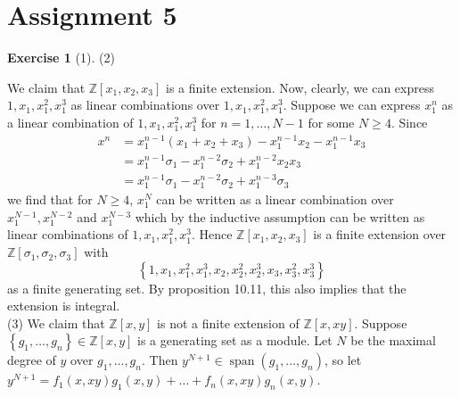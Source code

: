 \documentclass[reqno]{amsart}
\theoremstyle{definition}
\newtheorem{exercise}[theorem]{Exercise}
\theoremstyle{remark}
\DeclareMathOperator{\Span}{span}
\begin{document}
    \section{Assignment 5}
        \begin{exercise}[1]
        (2)

    We claim that
    $\mathbb{Z} \left[ x_1, x_2, x_3 \right] $ is a
    finite extension.
    Now, clearly, we can express
    $1, x_1, x_1^{2}, x_1^3$ as linear combinations over
    $1, x_1, x_1^{2}, x_1^3$.
    Suppose we can express $x_1^{n}$ as
    a linear combination of
    $1, x_1, x_1^2, x_1^{3}$ for
    $n = 1, \ldots, N-1$ for
    some $N \ge 4$. Since
    \begin{align*}
        x^{n}
        &= x_1^{n-1} \left( x_1+ x_2 + x_3  \right)
        - x_1^{n-1} x_2 - x_1^{n-1} x_3\\
        &= x_1^{n-1} \sigma_1 -
        x_1^{n-2} \sigma_2 + x_1^{n-2} x_2 x_3\\
        &= x_1^{n-1} \sigma_1 - x_1^{n-2} \sigma_2
        + x_1^{n-3} \sigma_3
    \end{align*}
    we find that for
    $N \ge 4$,
    $x_1^{N}$ can be written as a linear combination
    over
    $x_1^{N-1}, x_1^{N-2}$ and
    $x_1^{N-3}$ which by the inductive assumption
    can be written as linear combinations
    of $1, x_1, x_1^2, x_1^3$.
    Hence
    $\mathbb{Z}\left[ x_1, x_2, x_3 \right] $ is
    a finite extension over
    $\mathbb{Z}\left[ \sigma_1, \sigma_2, \sigma_3 \right] $ with
    \[
    \left\{ 1, x_1, x_1^2, x_1^3, x_2,x_2^2,
    x_2^3, x_3, x_3^2, x_3^3 \right\}
    \]
    as a finite generating set.
    By proposition 10.11, this also implies that
    the extension is integral.\\
    \linebreak
    (3) We claim that
    $\mathbb{Z}\left[ x,y \right] $ is
    not a finite extension of
    $\mathbb{Z}\left[ x,xy \right] $.
     Suppose
     $\left\{ g_1, \ldots, g_n \right\}
     \in \mathbb{Z}\left[ x,y \right] $ is a
     generating set as a module.
     Let $N$ be the maximal degree of $y$ over
     $g_1, \ldots, g_n$.
     Then
     $y^{N+1} \in
     \Span \left( g_1, \ldots, g_n \right) $, so
     let
     $y^{N+1} = f_1(x,xy) g_1(x,y) + \ldots +
     f_n (x,xy) g_n(x,y)$.


\end{exercise}
\end{document}
